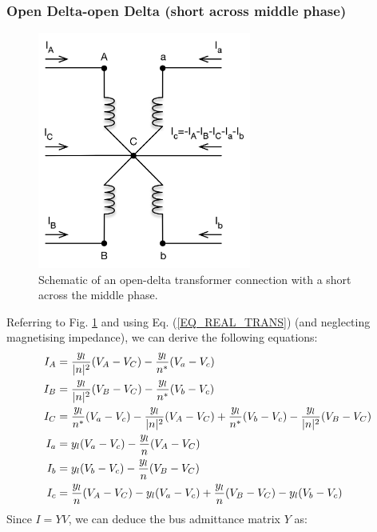 \documentclass[11pt]{article}
\begin{document}
\subsubsection{Open Delta-open Delta (short across middle phase)}
\begin{figure}
\begin{center}
\includegraphics[width=7cm]{OpenDeltaB.png}
\caption{Schematic of an open-delta transformer connection with a short across the middle phase.}
\label{FIG_OPEN_DELTA_B}
\end{center}
\end{figure}
Referring to Fig. \ref{FIG_OPEN_DELTA_B} and using Eq. (\ref{EQ_REAL_TRANS}) (and neglecting magnetising impedance),  we can derive the following equations:
\renewcommand{\maa}{\ensuremath{\frac{y_l}{|n|^2}}}
\renewcommand{\mab}{\ensuremath{\frac{y_l}{n^*}}}
\renewcommand{\mba}{\ensuremath{\frac{y_l}{n}}}
\renewcommand{\mbb}{\ensuremath{y_l}}
\begin{align}
	I_A &= \maa(V_A - V_C) - \mab(V_a - V_c) \notag \\
	I_B &= \maa(V_B - V_C) - \mab(V_b - V_c) \notag \\
	I_C &= \mab(V_a - V_c) - \maa(V_A - V_C) + \mab(V_b - V_c) - \maa(V_B - V_C) \notag \\
	I_a &= \mbb(V_a - V_c) - \mba(V_A - V_C) \notag \\
	I_b &= \mbb(V_b - V_c) - \mba(V_B - V_C) \notag \\
	I_c &= \mba(V_A - V_C) - \mbb(V_a - V_c) + \mba(V_B - V_C) - \mbb(V_b - V_c)
\end{align}
Since $I = YV$, we can deduce the bus admittance matrix $Y$ as:
\renewcommand{\maa}[1]{\ensuremath{#1/|n|^2}}
\renewcommand{\mab}[1]{\ensuremath{#1/n^*}}
\renewcommand{\mba}[1]{\ensuremath{#1/n}}
\renewcommand{\mbb}[1]{\ensuremath{#1}}
\end{document}
